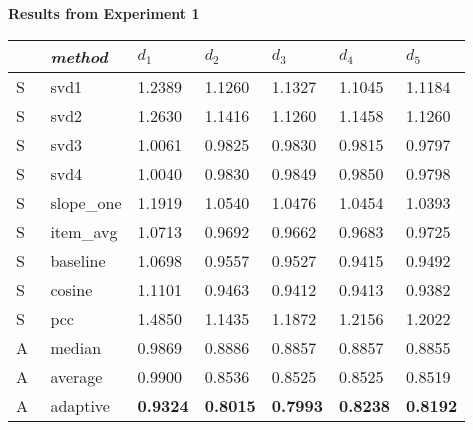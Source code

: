 \begin{table}[p]
  \centering

  \textbf{Results from Experiment 1}

  \vspace{3em}

  \begin{tabular*}{\textwidth}{ l p{3cm} p{1.5cm} p{1.5cm} p{1.5cm} p{1.5cm} p{1.5cm} }
    \toprule
      ~ & \emph{method} & 
      $d_1$ & $d_2$ & $d_3$ & $d_4$ & $d_5$ \\ 
    \midrule
    S & svd1          & 1.2389	  & 1.1260	  & 1.1327	  & 1.1045	  & 1.1184	 \\
    S & svd2          & 1.2630	  & 1.1416    & 1.1260	  & 1.1458	  & 1.1260	 \\
    S & svd3          & 1.0061	  & 0.9825	  & 0.9830	  & 0.9815	  & 0.9797	 \\
    S & svd4          & 1.0040	  & 0.9830	  & 0.9849	  & 0.9850	  & 0.9798	 \\
    S & slope\_one    & 1.1919	  & 1.0540	  & 1.0476	  & 1.0454	  & 1.0393   \\
    S & item\_avg     & 1.0713	  & 0.9692	  & 0.9662	  & 0.9683	  & 0.9725	 \\
    S & baseline       & 1.0698	  & 0.9557	  & 0.9527	  & 0.9415	  & 0.9492	 \\
    S & cosine   	    & 1.1101	  & 0.9463	  & 0.9412	  & 0.9413	  & 0.9382	 \\
    S & pcc       	  & 1.4850	  & 1.1435	  & 1.1872    & 1.2156	  & 1.2022	 \\
    \midrule                                                                    
    A & median    	  & 0.9869	  & 0.8886	  & 0.8857    & 0.8857	  & 0.8855	 \\
    A & average    	  & 0.9900	  & 0.8536	  & 0.8525	  & 0.8525	  & 0.8519	 \\
    A & adaptive       & \textbf{0.9324}	  & \textbf{0.8015}	  & \textbf{0.7993}  & \textbf{0.8238} & \textbf{0.8192} \\
    \bottomrule
  \end{tabular*}

  \vspace{3em}


\end{table}
